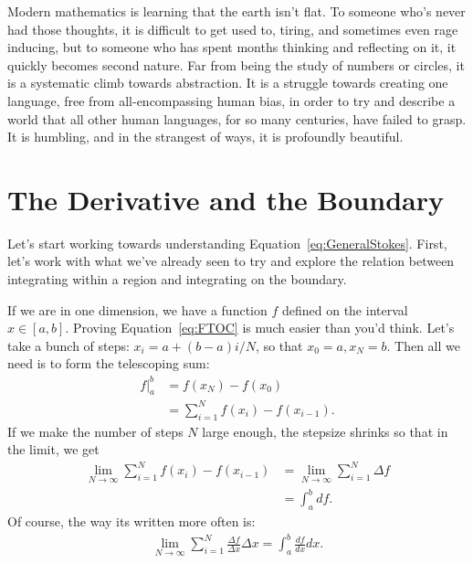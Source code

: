 	
	Modern mathematics is learning that the earth isn't flat. To someone who's never had those thoughts, it is difficult to get used to, tiring, and sometimes even rage inducing, but to someone who has spent months thinking and reflecting on it, it quickly becomes second nature. Far from being the study of numbers or circles, it is a systematic climb towards abstraction.  It is a struggle towards creating one language, free from all-encompassing human bias, in order to try and describe a world that all other human languages, for so many centuries, have failed to grasp. It is humbling, and in the strangest of ways, it is profoundly beautiful.



\section{The Derivative and the Boundary} %
\label{sec:the_derivative_and_the_boundary}


	Let's start working towards understanding Equation~\eqref{eq:GeneralStokes}. First, let's work with what we've already seen to try and explore the relation between integrating within a region and integrating on the boundary. 
	
	If we are in one dimension, we have a function $f$ defined on the interval $x \in [a,b]$. Proving Equation~\eqref{eq:FTOC} is much easier than you'd think. Let's take a bunch of steps: $x_i = a + (b-a)i/N$, so that $x_0 = a, x_N = b$. Then all we need is to form the telescoping sum:	
	\begin{align*}
		f\rvert^b_a &= f(x_N) - f(x_0) \\& = \sum_{i=1}^N f(x_{i})-f(x_{i-1}).
	\end{align*}
	If we make the number of steps $N$ large enough, the stepsize shrinks so that in the limit, we get
	\begin{align*}
		\lim_{N \rightarrow \infty} 	\sum_{i=1}^N f(x_{i})-f(x_{i-1}) & = \lim_{N \rightarrow \infty} 	\sum_{i=1}^N \Delta f \\ & = \int_a^b df.
	\end{align*}
	Of course, the way its written more often is:
	\begin{align*}
		\lim_{N \rightarrow \infty} 	\sum_{i=1}^N \frac{\Delta f}{\Delta x} \Delta x  = \int_{a}^{b} \frac{df}{dx} dx.
	\end{align*}
	
